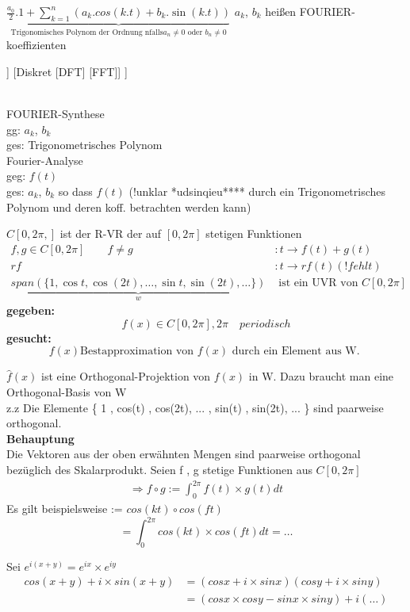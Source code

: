 \begin{remark}
$\underbrace{\frac{a_0}{2}.1+\sum_{k=1}^{n}(a_k.cos(k.t)+b_k.\sin(k.t))}_{\text{Trigonomisches Polynom der Ordnung nfalls} a_n \neq 0\text{ oder }b_n \neq 0}$
$a_k$, $b_k$ heißen FOURIER-koeffizienten
\end{remark}
 
	\begin{forest}
	[FOURIER-Theorie 
	[	kontinuierlich[Fourier-Reihen]  ]
	[Diskret [DFT] [FFT]]
	]
\end{forest}\\

\newpage
FOURIER-Synthese\\
gg: $a_k$, $b_k$\\
ges: Trigonometrisches Polynom\\
Fourier-Analyse\\
geg: $f(t)$\\
ges: $a_k$, $b_k$ so dass $f(t)$ (!unklar *udsinqieu**** durch ein Trigonometrisches Polynom und deren koff. betrachten werden kann)\\
\begin{remark}
$	C[0,2\pi,]$ ist der R-VR der auf $[0,2\pi]$ stetigen Funktionen \\

 \begin{align*}
f,g \in C[0,2\pi] \qquad f \neq g &: t \rightarrow f(t) + g(t)\\
r f &:t \rightarrow rf(t)  (!fehlt)\\
\underbrace{span( \{ 1,\cos t , \cos(2t),\dots,\sin t,\sin (2t),\dots   \}) }_{w}&\text{ ist ein UVR von }  C[0,2\pi]
\end{align*}
\textbf{gegeben:} 
\[ f(x) \in  C[0,2\pi] , 2\pi \quad periodisch   \]
\textbf{gesucht:} \[ f(x) \text{Bestapproximation von } f(x)  \text{ durch ein Element aus W. } \]  
\end{remark}
$\hat{f}(x)$ ist eine Orthogonal-Projektion von $f(x)$ in W. Dazu braucht man eine Orthogonal-Basis von W \\
z.z Die Elemente \{ 1 , cos(t) , cos(2t), ... , sin(t) , sin(2t), ... \} sind paarweise orthogonal.\\
\textbf{Behauptung}\\
Die Vektoren aus der oben erwähnten Mengen sind paarweise orthogonal bezüglich des Skalarprodukt.
Seien f , g stetige Funktionen aus $C[0,2 \pi]$  
\begin{align*}
\Rightarrow f \circ  g := \int_{0}^{2 \pi} {f(t) \times  g(t) dt } 
\end{align*}
Es gilt beispielsweise := $ cos(kt) \circ cos(ft)$
$$ = \int_{0}^{2 \pi} cos (kt) \times cos(ft)dt = \dots  $$
\begin{remark}
Sei $e^{i(x+y)}= e^{ix} \times e^{iy} $
\begin{align*}
cos(x+y) + i \times sin(x+y) &= (cos x + i \times sin x) 
(cos y + i \times sin y)\\
&= (cosx \times cos y - sin x \times sin y ) + i( \dots  )
\end{align*}
\end{remark}
